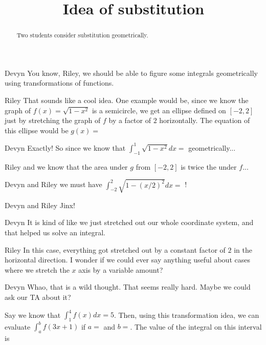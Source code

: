 \documentclass{ximera}
\title[Break-Ground:]{Idea of substitution}
\begin{document}
\begin{abstract}
Two students consider substitution geometrically.
\end{abstract}
\maketitle









\begin{dialogue}
\item[Devyn] You know, Riley, we should be able to figure some integrals geometrically using transformations of functions.
\item[Riley] That sounds like a cool idea.  One example would be, since we know the graph of $f(x) = \sqrt{1-x^2}$ is a semicircle, we get an ellipse defined on $[-2,2]$ just by stretching the graph of $f$ by a factor of $2$ horizontally.  The equation of this ellipse would be $g(x) = $ 
\item[Devyn] Exactly!  So since we know that $\int_{-1}^1 \sqrt{1-x^2} dx = $ geometrically...
\item[Riley] and we know that the area under $g$ from $[-2,2]$ is twice the under $f$...
\item[Devyn and Riley] we must have $\int_{-2}^2 \sqrt{1-(x/2)^2} dx = $  !
\item[Devyn and Riley] Jinx!
\item[Devyn] It is kind of like we just stretched out our whole coordinate system, and that helped us solve an integral.
\item[Riley] In this case, everything got stretched out by a constant factor of $2$ in the horizontal direction.  I wonder if we could ever say anything useful about cases where we stretch the $x$ axis by a variable amount?
\item[Devyn] Whao, that is a wild thought.  That seems really hard.  Maybe we could ask our TA about it?
\end{dialogue}

\begin{question}
Say we know that $\int_1^4 f(x) dx = 5$.  Then, using this transformation idea, we can evaluate $\int_a^b f(3x+1)$ if $a=$  and $b=$.  The value of the integral on this interval is 
\end{question}


\end{document}
